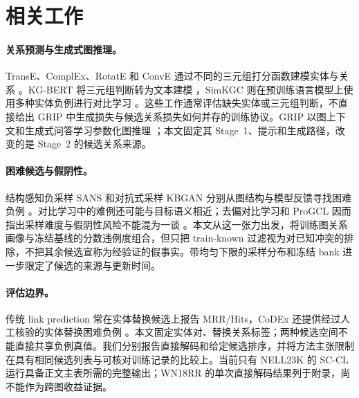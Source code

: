 \section{相关工作}

\paragraph{关系预测与生成式图推理。}
TransE、ComplEx、RotatE 和 ConvE 通过不同的三元组打分函数建模实体与关系 \citep{bordes2013transe,trouillon2016complex,sun2019rotate,dettmers2018conve}。KG-BERT 将三元组判断转为文本建模 \citep{yao2019kgbert}，SimKGC 则在预训练语言模型上使用多种实体负例进行对比学习 \citep{wang2022simkgc}。这些工作通常评估缺失实体或三元组判断，不直接给出 GRIP 中生成损失与候选关系损失如何并存的训练协议。GRIP 以图上下文和生成式问答学习参数化图推理 \citep{feng2025grip}；本文固定其 Stage~1、提示和生成路径，改变的是 Stage~2 的候选关系来源。

\paragraph{困难候选与假阴性。}
结构感知负采样 SANS 和对抗式采样 KBGAN 分别从图结构与模型反馈寻找困难负例 \citep{ahrabian2020sans,cai2018kbgan}。对比学习中的难例还可能与目标语义相近；去偏对比学习和 ProGCL 因而指出采样难度与假阴性风险不能混为一谈 \citep{chuang2020dcl,xia2022progcl}。本文从这一张力出发，将训练图关系画像与冻结基线的分数违例度组合，但只把 train-known 过滤视为对已知冲突的排除，不把其余候选宣称为经验证的假事实。带均匀下限的采样分布和冻结 bank 进一步限定了候选的来源与更新时间。

\paragraph{评估边界。}
传统 link prediction 常在实体替换候选上报告 MRR/Hits，CoDEx 还提供经过人工核验的实体替换困难负例 \citep{safavi2020codex}。本文固定实体对、替换关系标签；两种候选空间不能直接共享负例真值。我们分别报告直接解码和给定候选排序，并将方法主张限制在具有相同候选列表与可核对训练记录的比较上。当前只有 NELL23K 的 SC-CL 运行具备正文主表所需的完整输出；WN18RR 的单次直接解码结果列于附录，尚不能作为跨图收益证据。
